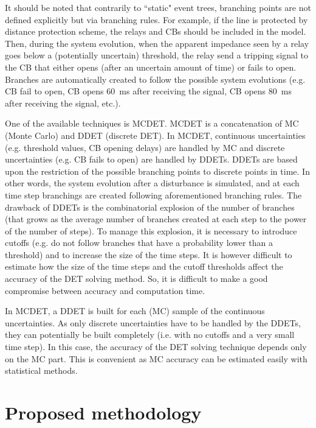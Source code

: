 It should be noted that contrarily to ``static" event trees, branching points are not defined explicitly but via branching rules. For example, if the line is protected by distance protection scheme, the relays and CBs should be included in the model. Then, during the system evolution, when the apparent impedance seen by a relay goes below a (potentially uncertain) threshold, the relay send a tripping signal to the CB that either opens (after an uncertain amount of time) or fails to open. Branches are automatically created to follow the possible system evolutions (e.g. CB fail to open, CB opens 60~ms after receiving the signal, CB opens 80~ms after receiving the signal, etc.).

One of the available techniques is MCDET. MCDET is a concatenation of MC (Monte Carlo) and DDET (discrete DET). In MCDET, continuous uncertainties (e.g. threshold values, CB opening delays) are handled by MC and discrete uncertainties (e.g. CB fails to open) are handled by DDETs. DDETs are based upon the restriction of the possible branching points to discrete points in time. In other words, the system evolution after a disturbance is simulated, and at each time step branchings are created following aforementioned branching rules. The drawback of DDETs is the combinatorial explosion of the number of branches (that grows as the average number of branches created at each step to the power of the number of steps). To manage this explosion, it is necessary to introduce cutoffs (e.g. do not follow branches that have a probability lower than a threshold) and to increase the size of the time steps. It is however difficult to estimate how the size of the time steps and the cutoff thresholds affect the accuracy of the DET solving method. So, it is difficult to make a good compromise between accuracy and computation time.

In MCDET, a DDET is built for each (MC) sample of the continuous uncertainties. As only discrete uncertainties have to be handled by the DDETs, they can potentially be built completely (i.e. with no cutoffs and a very small time step). In this case, the accuracy of the DET solving technique depends only on the MC part. This is convenient as MC accuracy can be estimated easily with statistical methods.


\section{Proposed methodology}
\label{sec:proposedMethodology}

